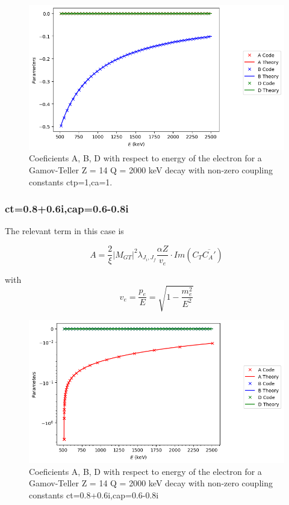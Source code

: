 \documentclass[twocolumn]{article}
\begin{document}
\begin{figure}
	\centering
	\includegraphics[width=\columnwidth]{plots/ctcap_real_gt_result.png}
	\caption{Coeficients A, B, D with respect to energy of the electron for a Gamov-Teller Z = 14 Q = 2000 keV decay  with non-zero coupling constants ctp=1,ca=1.}
\end{figure}

\subsubsection*{ct=0.8+0.6i,cap=0.6-0.8i}

The relevant term in this case is 

$$A= \frac{2}{\xi}|M_{GT}|^2\lambda_{J_i,J_f}\frac{\alpha Z}{v_e}\cdot Im(C_T\overline{C_A'})$$

with $$v_e = \frac{p_e}{E} = \sqrt{1-\frac{m^2_e}{E^2}}$$

\begin{figure}
	\centering
	\includegraphics[width=\columnwidth]{plots/ctcap_comp_gt_result.png}
	\caption{Coeficients A, B, D with respect to energy of the electron for a Gamov-Teller Z = 14 Q = 2000 keV decay with non-zero coupling constants ct=0.8+0.6i,cap=0.6-0.8i}
\end{figure}
\end{document}
